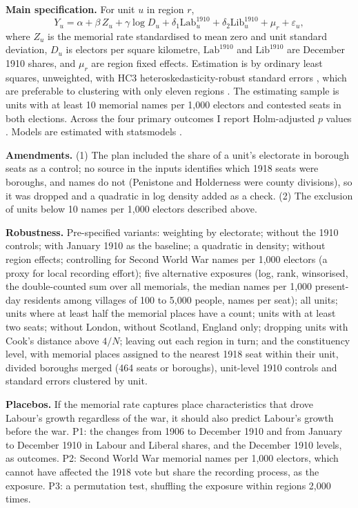 \documentclass[11pt,a4paper]{article}
\begin{document}
\textbf{Main specification.} For unit $u$ in region $r$,
\begin{equation}
Y_u = \alpha + \beta\, Z_u + \gamma \log D_u + \delta_1 \text{Lab}^{1910}_u + \delta_2 \text{Lib}^{1910}_u + \mu_r + \varepsilon_u,
\end{equation}
where $Z_u$ is the memorial rate standardised to mean zero and unit standard deviation, $D_u$ is electors per square kilometre, $\text{Lab}^{1910}$ and $\text{Lib}^{1910}$ are December 1910 shares, and $\mu_r$ are region fixed effects. Estimation is by ordinary least squares, unweighted, with HC3 heteroskedasticity-robust standard errors \citep{mackinnon1985}, which are preferable to clustering with only eleven regions \citep{cameron2015}. The estimating sample is units with at least 10 memorial names per 1,000 electors and contested seats in both elections. Across the four primary outcomes I report Holm-adjusted $p$ values \citep{holm1979}. Models are estimated with statsmodels \citep{seabold2010}.

\textbf{Amendments.} (1) The plan included the share of a unit's electorate in borough seats as a control; no source in the inputs identifies which 1918 seats were boroughs, and names do not (Penistone and Holderness were county divisions), so it was dropped and a quadratic in log density added as a check. (2) The exclusion of units below 10 names per 1,000 electors described above.

\textbf{Robustness.} Pre-specified variants: weighting by electorate; without the 1910 controls; with January 1910 as the baseline; a quadratic in density; without region effects; controlling for Second World War names per 1,000 electors (a proxy for local recording effort); five alternative exposures (log, rank, winsorised, the double-counted sum over all memorials, the median names per 1,000 present-day residents among villages of 100 to 5,000 people, names per seat); all units; units where at least half the memorial places have a count; units with at least two seats; without London, without Scotland, England only; dropping units with Cook's distance above $4/N$; leaving out each region in turn; and the constituency level, with memorial places assigned to the nearest 1918 seat within their unit, divided boroughs merged (464 seats or boroughs), unit-level 1910 controls and standard errors clustered by unit.

\textbf{Placebos.} If the memorial rate captures place characteristics that drove Labour's growth regardless of the war, it should also predict Labour's growth before the war. P1: the changes from 1906 to December 1910 and from January to December 1910 in Labour and Liberal shares, and the December 1910 levels, as outcomes. P2: Second World War memorial names per 1,000 electors, which cannot have affected the 1918 vote but share the recording process, as the exposure. P3: a permutation test, shuffling the exposure within regions 2,000 times.
\end{document}
